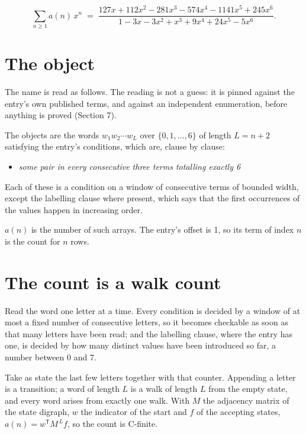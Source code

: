 \documentclass[11pt]{article}
\theoremstyle{definition}
\begin{document}
\[\sum_{n \ge 1} a(n)\,x^n \;=\; \frac{127x + 112x^{2} - 281x^{3} - 574x^{4} - 1141x^{5} + 245x^{6}}{1 - 3x - 3x^{2} + x^{3} + 9x^{4} + 24x^{5} - 5x^{6}}.\]

\section{The object}

The name is read as follows. The reading is not a guess: it is pinned against the entry's own published terms, and against an independent enumeration, before anything is proved (Section 7).

The objects are the words $w_1 w_2 \cdots w_L$ over $\{0,1,\dots,6\}$ of length $L = n + 2$ satisfying the entry's conditions, which are, clause by clause:

\begin{itemize}

\item {\itshape some pair in every consecutive three terms totalling exactly 6}

\end{itemize}

Each of these is a condition on a window of consecutive terms of bounded width, except the labelling clause where present, which says that the first occurrences of the values happen in increasing order.

$a(n)$ is the number of such arrays. The entry's offset is 1, so its term of index $n$ is the count for $n$ rows.

\section{The count is a walk count}

Read the word one letter at a time. Every condition is decided by a window of at most a fixed number of consecutive letters, so it becomes checkable as soon as that many letters have been read; and the labelling clause, where the entry has one, is decided by how many distinct values have been introduced so far, a number between $0$ and 7.

Take as state the last few letters together with that counter. Appending a letter is a transition; a word of length $L$ is a walk of length $L$ from the empty state, and every word arises from exactly one walk. With $M$ the adjacency matrix of the state digraph, $w$ the indicator of the start and $f$ of the accepting states, $a(n) = w^{\mathsf T}M^{\,L}f$, so the count is C-finite.
\end{document}
